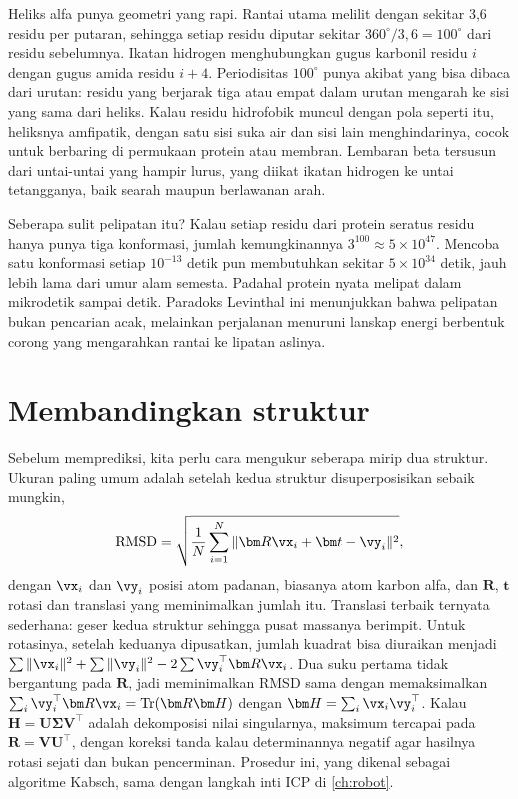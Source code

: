 Heliks alfa punya geometri yang rapi. Rantai utama melilit dengan sekitar 3,6 residu per putaran, sehingga setiap residu
diputar sekitar $360^\circ/3{,}6=100^\circ$ dari residu sebelumnya. Ikatan hidrogen menghubungkan gugus karbonil residu
$i$ dengan gugus amida residu $i+4$. Periodisitas $100^\circ$ punya akibat yang bisa dibaca dari urutan: residu yang berjarak
tiga atau empat dalam urutan mengarah ke sisi yang sama dari heliks. Kalau residu hidrofobik muncul dengan pola seperti itu,
heliksnya amfipatik, dengan satu sisi suka air dan sisi lain menghindarinya, cocok untuk berbaring di permukaan protein atau
membran. Lembaran beta tersusun dari untai-untai yang hampir lurus, yang diikat ikatan hidrogen ke untai tetangganya, baik
searah maupun berlawanan arah.

Seberapa sulit pelipatan itu? Kalau setiap residu dari protein seratus residu hanya punya tiga konformasi, jumlah
kemungkinannya $3^{100}\approx5\times10^{47}$. Mencoba satu konformasi setiap $10^{-13}$ detik pun membutuhkan sekitar
$5\times10^{34}$ detik, jauh lebih lama dari umur alam semesta. Padahal protein nyata melipat dalam mikrodetik sampai detik.
Paradoks Levinthal ini menunjukkan bahwa pelipatan bukan pencarian acak, melainkan perjalanan menuruni lanskap energi
berbentuk corong yang mengarahkan rantai ke lipatan aslinya.

\section{Membandingkan struktur}

Sebelum memprediksi, kita perlu cara mengukur seberapa mirip dua struktur. Ukuran paling umum adalah  setelah kedua struktur disuperposisikan sebaik mungkin,
\begin{equation}
\mathrm{RMSD}=\sqrt{\frac1N\sum_{i=1}^N\|\bm R\vx_i+\bm t-\vy_i\|^2},
\end{equation}
dengan $\vx_i$ dan $\vy_i$ posisi atom padanan, biasanya atom karbon alfa, dan $\bm R$, $\bm t$ rotasi dan translasi yang
meminimalkan jumlah itu. Translasi terbaik ternyata sederhana: geser kedua struktur sehingga pusat massanya berimpit. Untuk
rotasinya, setelah keduanya dipusatkan, jumlah kuadrat bisa diuraikan menjadi
$\sum\|\vx_i\|^2+\sum\|\vy_i\|^2-2\sum\vy_i^\top\bm R\vx_i$. Dua suku pertama tidak bergantung pada $\bm R$, jadi meminimalkan
RMSD sama dengan memaksimalkan $\sum_i\vy_i^\top\bm R\vx_i=\mathrm{Tr}(\bm R\bm H)$ dengan $\bm H=\sum_i\vx_i\vy_i^\top$. Kalau
$\bm H=\bm U\bm\Sigma\bm V^\top$ adalah dekomposisi nilai singularnya, maksimum tercapai pada $\bm R=\bm V\bm U^\top$, dengan koreksi
tanda kalau determinannya negatif agar hasilnya rotasi sejati dan bukan pencerminan. Prosedur ini, yang dikenal sebagai
algoritme Kabsch, sama dengan langkah inti ICP di \cref{ch:robot}.

